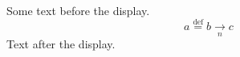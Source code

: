 \documentclass[12pt]{article}
\begin{document}
Some text before the display.
\[ a \overset{\text{def}}{=} b \underset{n}{\to} c \]
Text after the display.
\end{document}
